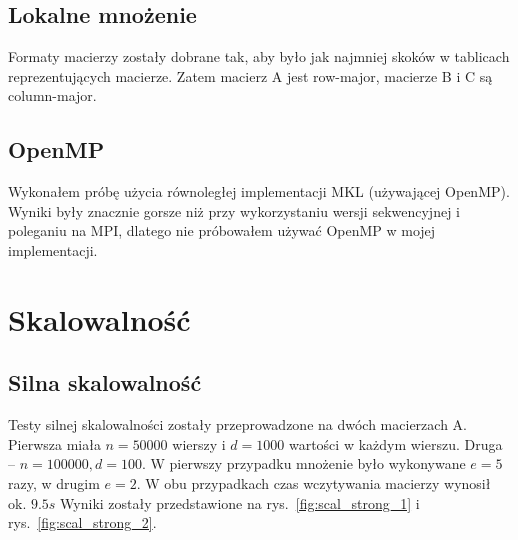 \documentclass{article}
\begin{document}
\subsection{Lokalne mnożenie}
Formaty macierzy zostały dobrane tak, aby było jak najmniej skoków w tablicach reprezentujących macierze.
Zatem macierz A jest row-major, macierze B i C są column-major.

\subsection{OpenMP}
Wykonałem próbę użycia równoległej implementacji MKL (używającej OpenMP). Wyniki były znacznie gorsze niż przy
wykorzystaniu wersji sekwencyjnej i poleganiu na MPI, dlatego nie próbowałem używać OpenMP w mojej implementacji.

\section{Skalowalność}

\subsection{Silna skalowalność}

Testy silnej skalowalności zostały przeprowadzone na dwóch macierzach A. 
Pierwsza miała $n=50000$ wierszy i $d=1000$ wartości w każdym wierszu. Druga -- $n=100000, d=100$.
W pierwszy przypadku mnożenie było wykonywane $e=5$ razy, w drugim $e=2$.
W obu przypadkach czas wczytywania macierzy wynosił ok. $9.5s$
Wyniki zostały przedstawione na rys.~\ref{fig:scal_strong_1} i rys.~\ref{fig:scal_strong_2}.
\end{document}
